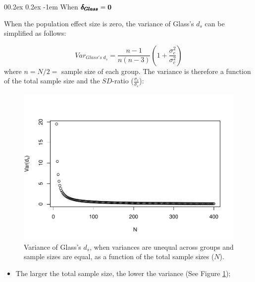 \documentclass[
  english,
  man,mask]{apa6}
\makeatletter
\providecommand{\tightlist}{%
  \setlength{\itemsep}{0pt}\setlength{\parskip}{0pt}}
\let\oldparagraph\paragraph
\renewcommand{\paragraph}[1]{\oldparagraph{#1}\mbox{}}
\renewcommand{\paragraph}{\@startsection{paragraph}{4}{\parindent}%
  {0\baselineskip \@plus 0.2ex \@minus 0.2ex}%
  {-1em}%
  {\normalfont\normalsize\bfseries\itshape\typesectitle}}
\makeatother
\begin{document}
\hypertarget{when-bf-pmbdelta_glass0-1}{%
\paragraph{\texorpdfstring{When \(\bf \pmb{\delta_{Glass}}=0\)}{When \textbackslash bf \textbackslash pmb\{\textbackslash delta\_\{Glass\}\}=0}}\label{when-bf-pmbdelta_glass0-1}}

When the population effect size is zero, the variance of Glass's \(d_s\) can be simplified as follows:

\[Var_{Glass's \; d_s} = \frac{n-1}{n(n-3)} \left( 1+\frac{\sigma^2_e}{\sigma^2_c}\right)\]
where \(n=N/2=\) sample size of each group. The variance is therefore a function of the total sample size and the \(SD\)-ratio (\(\frac{\sigma_c}{\sigma_e}\)):

\begin{figure}
\centering
\includegraphics{Theoretical-Variance-of-all-estimators-as-a-function-of-population-parameters_files/figure-latex/varglassHetbalNsize2-1.pdf}
\caption{\label{fig:varglassHetbalNsize2}Variance of Glass's \(d_s\), when variances are unequal across groups and sample sizes are equal, as a function of the total sample sizes (\(N\)).}
\end{figure}

\begin{itemize}
\tightlist
\item
  The larger the total sample size, the lower the variance (See Figure \ref{fig:varglassHetbalNsize2});
\end{itemize}
\end{document}
